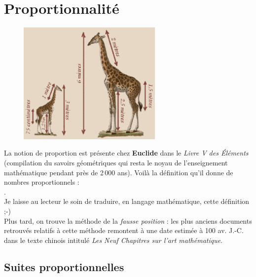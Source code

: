 \chapter{Proportionnalité} \label{D6}

\bigskip

\begin{figure}[h]
   \centering
      \includegraphics[height=6cm]{Organisation_gestion_donnees/Images/D6_intro_girafe}
\end{figure}

\begin{prerequis} 
   La notion de proportion est présente chez {\bf Euclide} dans le {\it Livre V des Éléments} (compilation du savoirs géométriques qui resta le noyau de l'enseignement mathématique pendant près de 2\,000 ans). Voilà la définition qu'il donne de nombres proportionnels : \\
   . \fg \\
   Je laisse au lecteur le soin de traduire, en langage mathématique, cette définition ;-) \\
   Plus tard, on trouve la méthode de la {\it fausse position} : les plus anciens documents retrouvés relatifs à cette méthode remontent à une date estimée à 100 av. J.-C. dans le texte chinois intitulé {\it Les Neuf Chapitres sur l'art mathématique}.
\end{prerequis}


\cours %

\section{Suites proportionnelles}

